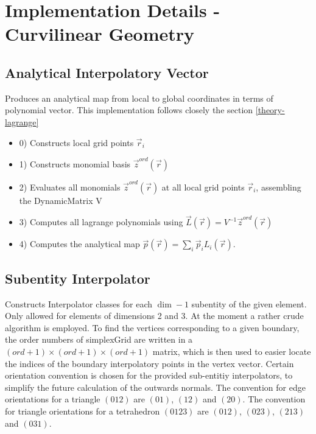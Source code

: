 \section{Implementation Details - Curvilinear Geometry}
\label{impl-geometry}

\subsection{Analytical Interpolatory Vector}
\label{impl-geometry-analytical-vector}

\noindent
Produces an analytical map from local to global coordinates in terms of polynomial vector. This implementation follows closely the section \ref{theory-lagrange}

\begin{itemize}
  \item 0) Constructs local grid points $\vec{r}_i$
  \item 1) Constructs monomial basis $\vec{z}^{ord}(\vec{r})$
  \item 2) Evaluates all monomials $\vec{z}^{ord}(\vec{r})$ at all local grid points $\vec{r}_i$, assembling the DynamicMatrix V
  \item 3) Computes all lagrange polynomials using $\vec{L}(\vec{r}) = V^{-1} \vec{z}^{ord}(\vec{r})$
  \item 4) Computes the analytical map $\vec{p}(\vec{r}) = \sum_i \vec{p}_i L_i (\vec{r})$.
\end{itemize}

\subsection{Subentity Interpolator}
\label{impl-geometry-subentity-interpolator}

\noindent
Constructs Interpolator classes for each $\dim - 1$ subentity of the given element. Only allowed for elements of dimensions 2 and 3. At the moment a rather crude algorithm is employed. To find the vertices corresponding to a given boundary, the order numbers of simplexGrid are written in a $(ord + 1) \times (ord + 1) \times (ord + 1)$ matrix, which is then used to easier locate the indices of the boundary interpolatory points in the vertex vector. Certain orientation convention is chosen for the provided sub-entitiy interpolators, to simplify the future calculation of the outwards normals. The convention for edge orientations for a triangle $(012)$ are $(01)$, $(12)$ and $(20)$. The convention for triangle orientations for a tetrahedron $(0123)$ are $(012)$, $(023)$, $(213)$ and $(031)$.


